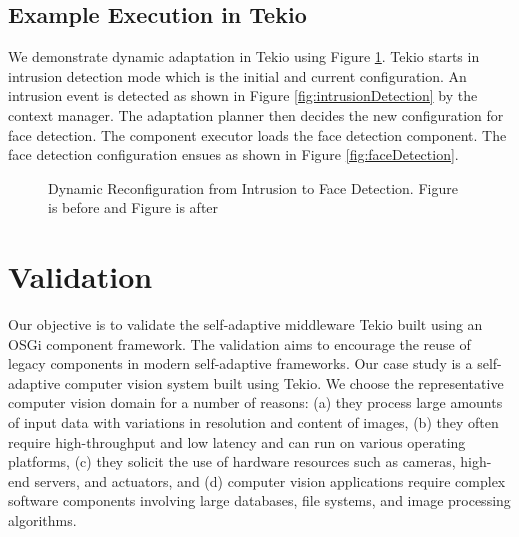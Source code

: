 \documentclass{acm_proc_article-sp}
\begin{document}
\subsection{Example Execution in Tekio}

We demonstrate dynamic adaptation in Tekio using  Figure
\ref{fig:exampleExecution}. Tekio starts in intrusion detection mode
which is the initial and current configuration. An intrusion event is
detected as shown in Figure \ref{fig:intrusionDetection} by the context manager. The adaptation planner then decides the new
  configuration for face detection. The component executor loads the face detection component. The face detection configuration ensues as
  shown in Figure  \ref{fig:faceDetection}.


\begin{figure}
\centering
{}
	\label{fig:exampleExecution}
	\caption[Dynamic Reconfiguration from Intrusion to Face Detection]{Dynamic Reconfiguration from Intrusion to Face Detection. Figure  is before and Figure  is after}
\end{figure}


\section{Validation}
\label{sec:validation}

Our objective is to validate the self-adaptive middleware Tekio built using an OSGi component framework. The validation aims to encourage the reuse of legacy components in modern self-adaptive frameworks. Our case study is a self-adaptive computer vision system built using Tekio. We choose the representative computer vision domain for a number of reasons: (a) they process large amounts of input data with variations in resolution and content of images, (b) they often require high-throughput and low latency and can run on various operating platforms, (c) they solicit the use of hardware resources such as cameras, high-end  servers, and actuators, and (d) computer vision applications require complex software components involving large databases, file systems, and image processing algorithms.
\end{document}
